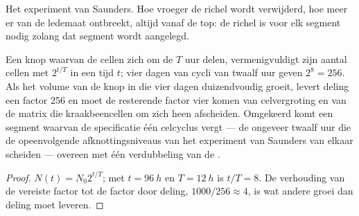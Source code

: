 \begin{omfigure}

{\small Het experiment van Saunders. Hoe vroeger de richel wordt
verwijderd, hoe meer er van de ledemaat ontbreekt, altijd vanaf de top: de
richel is voor elk segment nodig zolang dat segment wordt aangelegd.}
\end{omfigure}

\begin{theorem}\label{thm:b2:limb-organogenesis:growth}
Een knop waarvan de cellen zich om de $T$ uur delen, vermenigvuldigt zijn
aantal cellen met $2^{t/T}$ in een tijd $t$; vier dagen van cycli van twaalf uur geven
$2^{8} = 256$. Als het volume van de knop in die vier dagen duizendvoudig
groeit, levert deling een factor 256 en moet de resterende factor vier
komen van celvergroting en van de matrix die kraakbeencellen om zich heen
afscheiden. Omgekeerd komt een segment waarvan de specificatie één
celcyclus vergt --- de ongeveer twaalf uur die de opeenvolgende
afknottingsniveaus van het experiment van Saunders van elkaar scheiden ---
overeen met één verdubbeling van de .
\end{theorem}
\begin{proof}
$N(t) = N_0 2^{t/T}$; met $t = \qty{96}{h}$ en $T = \qty{12}{h}$ is
$t/T = 8$. De verhouding van de vereiste factor tot de factor door deling,
$1000/256 \approx 4$, is wat andere groei dan deling moet leveren.
\end{proof}

